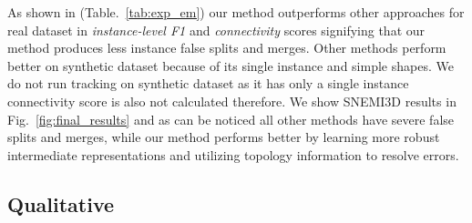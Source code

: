 As shown in (Table.~\ref{tab:exp_em}) our method outperforms other approaches for real dataset in {\em instance-level F1} and {\em connectivity} scores signifying that our method produces less instance false splits and merges. Other methods perform better on synthetic dataset because of its single instance and simple shapes. We do not run tracking on synthetic dataset as it has only a single instance connectivity score is also not calculated therefore.
We show SNEMI3D results in Fig.~\ref{fig:final_results} and as can be noticed all other methods have severe false splits and merges, while our method performs better by learning more robust intermediate representations and utilizing topology information to resolve errors.

\subsection{Qualitative}

